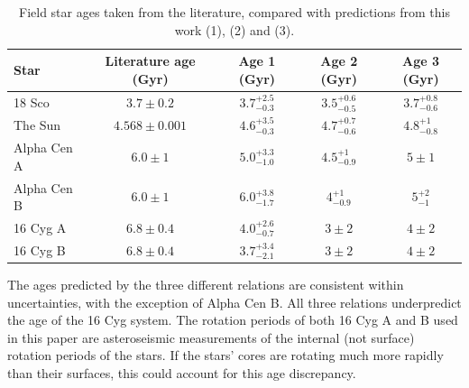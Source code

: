 \begin{table}
\caption[Field star predictions]
{Field star ages taken from the literature, compared with
	predictions from this work (1), \citet{Mamajek2008} (2)
	and \citet{Barnes2007} (3). \label{tab:comparison}}

\begin{tabular}{lcccc}
\hline\hline
{Star} & {Literature age (Gyr)} & {Age 1 (Gyr)} & {Age 2 (Gyr)} & {Age 3 (Gyr)} \\
\hline

18 Sco      & $3.7 \pm 0.2$     & $3.7^{+2.5}_{-0.3}$ & $3.5^{+0.6}_{-0.5}$
	    & $3.7^{+0.8}_{-0.6}$ \\

The Sun     & $4.568 \pm 0.001$ & $4.6^{+3.5}_{-0.3}$ & $4.7^{+0.7}_{-0.6}$
	    & $4.8^{+1}_{-0.8}$ \\

Alpha Cen A & $6.0 \pm 1$       & $5.0^{+3.3}_{-1.0}$   & $4.5^{+1}_{-0.9}$
	    & $5\pm1$ \\

Alpha Cen B & $6.0 \pm 1$       & $6.0^{+3.8}_{-1.7}$       & $4^{+1}_{-0.9}$
	    & $5^{+2}_{-1}$ \\

16 Cyg A    & $6.8 \pm 0.4$     & $4.0^{+2.6}_{-0.7}$       & $3\pm2$
	    & $4\pm2$ \\

16 Cyg B    & $6.8 \pm 0.4$     & $3.7^{+3.4}_{-2.1}$       & $3\pm2$
	    & $4\pm2$ \\
\hline
\end{tabular}
\end{table}

The ages predicted by the three different relations are consistent within
uncertainties, with the exception of Alpha Cen B.
All three relations underpredict the age of the 16 Cyg system.
The rotation periods of both 16 Cyg A and B used in this paper are
asteroseismic measurements of the internal (not surface) rotation periods
of the stars.
If the stars' cores are rotating much more rapidly than their surfaces, this
could account for this age discrepancy.

